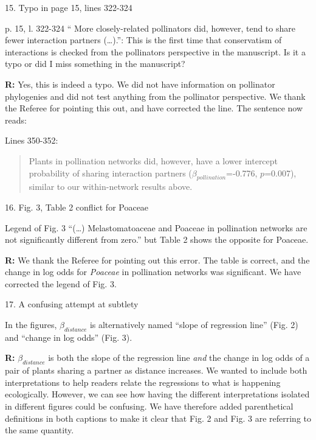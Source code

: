 \documentclass[12pt]{letter}
\newenvironment{refquote}{\bigskip \begin{it}}{\end{it}\smallskip}
\begin{document}
	15. Typo in page 15, lines 322-324


		\begin{refquote}
			p. 15, l. 322-324 “ More closely-related pollinators did, however, tend to share fewer interaction partners (…).”: This is the first time that conservatism of interactions is checked from the pollinators perspective in the manuscript. Is it a typo or did I miss something in the manuscript?
		\end{refquote}


		\textbf{R:} Yes, this is indeed a typo. We did not have information on pollinator phylogenies and did not test anything from the pollinator perspective. We thank the Referee for pointing this out, and have corrected the line. The sentence now reads:


		Lines 350-352:


		\begin{quotation}
			Plants in pollination networks did, however, have a lower intercept probability of sharing interaction partners ($\beta_{pollination}$=-0.776, $p$=0.007), similar to our within-network results above.
		\end{quotation}


	16. Fig. 3, Table 2 conflict for Poaceae


		\begin{refquote}
			Legend of Fig. 3 “(…) Melastomatoaceae and Poaceae in pollination networks are not significantly different from zero.” but Table 2 shows the opposite for Poaceae.
		\end{refquote}


		\textbf{R:} We thank the Referee for pointing out this error. The table is correct, and the change in log odds for \emph{Poaceae} in pollination networks was significant. We have corrected the legend of Fig. 3.


	17. A confusing attempt at subtlety

		\begin{refquote}
			In the figures, $\beta_{distance}$ is alternatively named “slope of regression line” (Fig. 2) and “change in log odds” (Fig. 3).
		\end{refquote}


		\textbf{R:} $\beta_{distance}$ is both the slope of the regression line \emph{and} the change in log odds of a pair of plants sharing a partner as distance increases. We wanted to include both interpretations to help readers relate the regressions to what is happening ecologically. However, we can see how having the different interpretations isolated in different figures could be confusing. We have therefore added parenthetical definitions in both captions to make it clear that Fig. 2 and Fig. 3 are referring to the same quantity.
\end{document}
